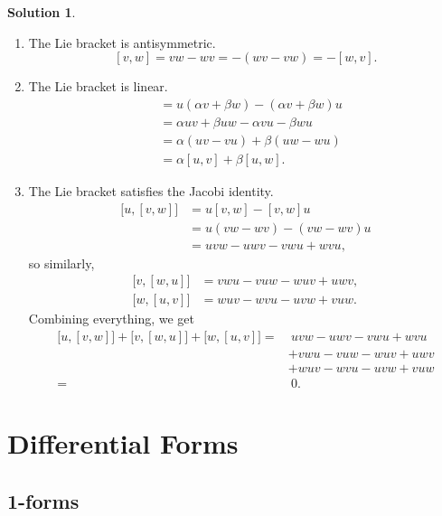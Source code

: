 \documentclass[11pt, a4paper]{article}
\theoremstyle{definition}
\newtheorem{sol}{Solution}[part]
\begin{document}
\begin{sol}
\mbox{}

\begin{enumerate}

\item The Lie bracket is antisymmetric.
    \[
        [v, w] = vw - wv = -(wv - vw) = -[w, v].
    \]

\item The Lie bracket is linear.
    \begin{align*}
        [u, \alpha v + \beta w] &= u (\alpha v + \beta w) - (\alpha v + \beta w) u \\
            &= \alpha uv + \beta uw - \alpha vu - \beta wu \\
            &= \alpha(uv - vu) + \beta(uw - wu) \\
            &= \alpha [u, v] + \beta [u, w].
    \end{align*}

\item The Lie bracket satisfies the Jacobi identity.
    \begin{align*}
        \big[u, [v, w]\big] &= u[v, w] - [v, w]u \\
            &= u(vw - wv) - (vw - wv)u \\
            &= uvw - uwv - vwu + wvu,
    \end{align*}
    so similarly,
    \begin{align*}
        \big[v, [w, u]\big] &= vwu - vuw - wuv + uwv, \\
        \big[w, [u, v]\big] &= wuv - wvu - uvw + vuw.
    \end{align*}
    Combining everything, we get
    \begin{align*}
        \big[u, [v, w]\big] + \big[v, [w, u]\big] + \big[w, [u, v]\big] =&\ uvw - uwv - vwu + wvu \\
            &+ vwu - vuw - wuv + uwv \\
            &+ wuv - wvu - uvw + vuw \\
            =&\ 0.
    \end{align*}
\end{enumerate}

\end{sol}

\section{Differential Forms}

\subsection{1-forms}
\end{document}
